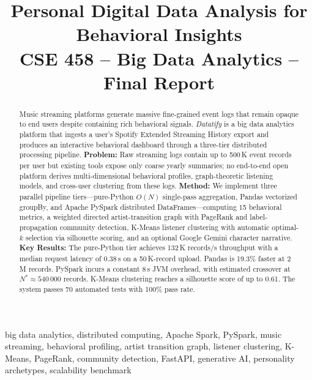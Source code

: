 \documentclass[conference]{IEEEtran}
\begin{document}
\title{Personal Digital Data Analysis for Behavioral Insights\\
{\large CSE 458 -- Big Data Analytics -- Final Report}}

\author{
}

\maketitle

\begin{abstract}
Music streaming platforms generate massive fine-grained event logs that
remain opaque to end users despite containing rich behavioral signals.
\textit{Datatify} is a big data analytics platform that ingests a user's
Spotify Extended Streaming History export and produces an interactive
behavioral dashboard through a three-tier distributed processing pipeline.
\textbf{Problem:} Raw streaming logs contain up to 500\,K event records
per user but existing tools expose only coarse yearly summaries; no
end-to-end open platform derives multi-dimensional behavioral profiles,
graph-theoretic listening models, and cross-user clustering from these logs.
\textbf{Method:} We implement three parallel pipeline tiers—pure-Python
$O(N)$ single-pass aggregation, Pandas vectorized groupBy, and Apache
PySpark distributed DataFrames—computing 15 behavioral metrics, a
weighted directed artist-transition graph with PageRank and
label-propagation community detection, K-Means listener clustering with
automatic optimal-$k$ selection via silhouette scoring, and an optional
Google Gemini character narrative.
\textbf{Key Results:} The pure-Python tier achieves 132\,K records/s
throughput with a median request latency of 0.38\,s on a 50\,K-record
upload. Pandas is 19.3\% faster at 2\,M records. PySpark incurs a
constant 8\,s JVM overhead, with estimated crossover at $N^* \approx
540\,000$ records. K-Means clustering reaches a silhouette score of up
to 0.61. The system passes 70 automated tests with 100\% pass rate.
\end{abstract}

\begin{IEEEkeywords}
big data analytics, distributed computing, Apache Spark, PySpark,
music streaming, behavioral profiling, artist transition graph,
listener clustering, K-Means, PageRank, community detection, FastAPI,
generative AI, personality archetypes, scalability benchmark
\end{IEEEkeywords}
\end{document}
